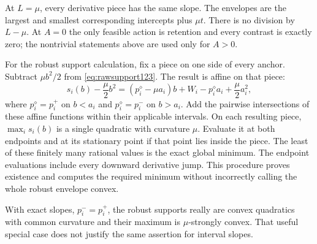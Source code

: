 At $L=\mu$, every derivative piece has the same slope. The envelopes
are the largest and smallest corresponding intercepts plus $\mu t$.
There is no division by $L-\mu$. At $A=0$ the only feasible action is
retention and every contrast is exactly zero; the nontrivial
statements above are used only for $A>0$.

For the robust support calculation, fix a piece on one side of every
anchor. Subtract $\mu b^2/2$ from \eqref{eq:rawsupport123}. The result
is affine on that piece:
\[
 s_i(b)-\frac\mu2 b^2
   =(p_i^\diamond-\mu a_i)b
     +W_i-p_i^\diamond a_i+\frac\mu2a_i^2,
\]
where $p_i^\diamond=p_i^+$ on $b<a_i$ and
$p_i^\diamond=p_i^-$ on $b>a_i$. Add the pairwise intersections
of these affine functions within their applicable intervals.
On each resulting piece, $\max_i s_i(b)$ is a single quadratic
with curvature $\mu$. Evaluate it at both endpoints and at its
stationary point if that point lies inside the piece. The least of
these finitely many rational values is the exact global minimum.
The endpoint evaluations include every downward derivative jump.
This procedure proves existence and computes the required minimum
without incorrectly calling the whole robust envelope convex.

With exact slopes, $p_i^-=p_i^+$, the robust supports really are
convex quadratics with common curvature and their maximum is
$\mu$-strongly convex. That useful special case does not justify
the same assertion for interval slopes.

